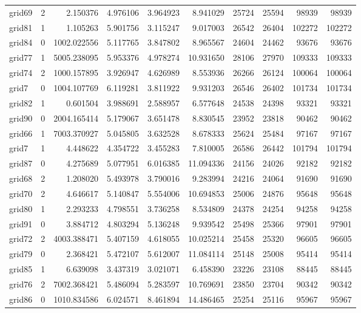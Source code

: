 \begin{longtable}{|l|r|r|r|r|r|r|r|r|r|}
grid69 & 2 & 2.150376 & 4.976106 & 3.964923 & 8.941029 & 25724 & 25594 & 98939 & 98939 \\
grid81 & 1 & 1.105263 & 5.901756 & 3.115247 & 9.017003 & 26542 & 26404 & 102272 & 102272 \\
grid84 & 0 & 1002.022556 & 5.117765 & 3.847802 & 8.965567 & 24604 & 24462 & 93676 & 93676 \\
grid77 & 1 & 5005.238095 & 5.953376 & 4.978274 & 10.931650 & 28106 & 27970 & 109333 & 109333 \\
grid74 & 2 & 1000.157895 & 3.926947 & 4.626989 & 8.553936 & 26266 & 26124 & 100064 & 100064 \\
grid7 & 0 & 1004.107769 & 6.119281 & 3.811922 & 9.931203 & 26546 & 26402 & 101734 & 101734 \\
grid82 & 1 & 0.601504 & 3.988691 & 2.588957 & 6.577648 & 24538 & 24398 & 93321 & 93321 \\
grid90 & 0 & 2004.165414 & 5.179067 & 3.651478 & 8.830545 & 23952 & 23818 & 90462 & 90462 \\
grid66 & 1 & 7003.370927 & 5.045805 & 3.632528 & 8.678333 & 25624 & 25484 & 97167 & 97167 \\
grid7 & 1 & 4.448622 & 4.354722 & 3.455283 & 7.810005 & 26586 & 26442 & 101794 & 101794 \\
grid87 & 0 & 4.275689 & 5.077951 & 6.016385 & 11.094336 & 24156 & 24026 & 92182 & 92182 \\
grid68 & 2 & 1.208020 & 5.493978 & 3.790016 & 9.283994 & 24216 & 24064 & 91690 & 91690 \\
grid70 & 2 & 4.646617 & 5.140847 & 5.554006 & 10.694853 & 25006 & 24876 & 95648 & 95648 \\
grid80 & 1 & 2.293233 & 4.798551 & 3.736258 & 8.534809 & 24378 & 24254 & 94258 & 94258 \\
grid91 & 0 & 3.884712 & 4.803294 & 5.136248 & 9.939542 & 25498 & 25366 & 97901 & 97901 \\
grid72 & 2 & 4003.388471 & 5.407159 & 4.618055 & 10.025214 & 25458 & 25320 & 96605 & 96605 \\
grid79 & 0 & 2.368421 & 5.472107 & 5.612007 & 11.084114 & 25148 & 25008 & 95414 & 95414 \\
grid85 & 1 & 6.639098 & 3.437319 & 3.021071 & 6.458390 & 23226 & 23108 & 88445 & 88445 \\
grid76 & 2 & 7002.368421 & 5.486094 & 5.283597 & 10.769691 & 23850 & 23704 & 90342 & 90342 \\
grid86 & 0 & 1010.834586 & 6.024571 & 8.461894 & 14.486465 & 25254 & 25116 & 95967 & 95967 \\

\end{longtable}
